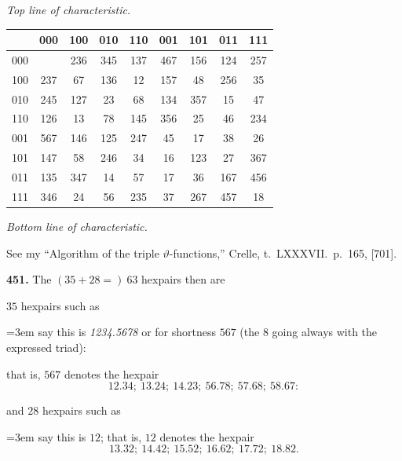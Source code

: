 \documentclass[12pt,a4paper]{article}
\theoremstyle{definition}
\begin{document}
\begin{center}
\small
\textit{Top line of characteristic.}
\end{center}

\begin{center}
\small
\begin{tabular}{|c|c|c|c|c|c|c|c|c|}
\hline
 & 000 & 100 & 010 & 110 & 001 & 101 & 011 & 111 \\
\hline
000 &  & 236 & 345 & 137 & 467 & 156 & 124 & 257 \\
\hline
100 & 237 & 67 & 136 & 12 & 157 & 48 & 256 & 35 \\
\hline
010 & 245 & 127 & 23 & 68 & 134 & 357 & 15 & 47 \\
\hline
110 & 126 & 13 & 78 & 145 & 356 & 25 & 46 & 234 \\
\hline
001 & 567 & 146 & 125 & 247 & 45 & 17 & 38 & 26 \\
\hline
101 & 147 & 58 & 246 & 34 & 16 & 123 & 27 & 367 \\
\hline
011 & 135 & 347 & 14 & 57 & 17 & 36 & 167 & 456 \\
\hline
111 & 346 & 24 & 56 & 235 & 37 & 267 & 457 & 18 \\
\hline
\end{tabular}
\end{center}

\begin{center}
\small
\textit{Bottom line of characteristic.}
\end{center}

\vspace{1em}

See my ``Algorithm of the triple $\vartheta$-functions,'' Crelle, t.~LXXXVII.\ p.~165, [701].

\vspace{1em}

\noindent\textbf{451.}\quad
The $(35 + 28 =)\ 63$ hexpairs then are

$35$ hexpairs such as

\noindent\hangindent=3em say this is \textit{1234.5678} or for shortness $567$ (the $8$ going always with the expressed triad):

\noindent that is, $567$ denotes the hexpair
\[
12.34;\ 13.24;\ 14.23;\ 56.78;\ 57.68;\ 58.67:
\]

\noindent and $28$ hexpairs such as

\noindent\hangindent=3em say this is $12$; that is, $12$ denotes the hexpair
\[
13.32;\ 14.42;\ 15.52;\ 16.62;\ 17.72;\ 18.82.
\]
\end{document}
